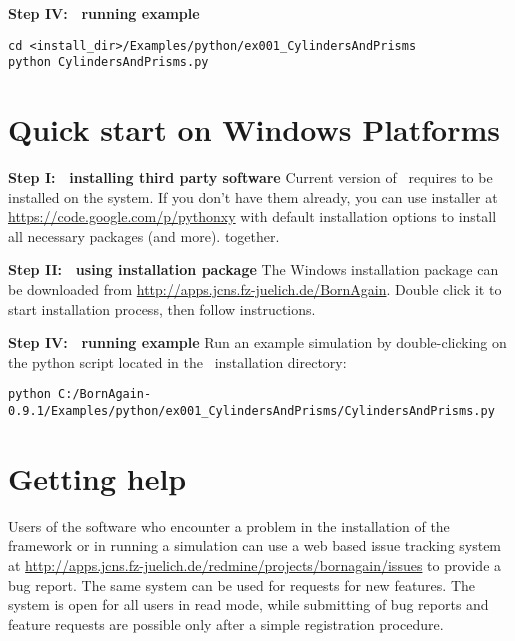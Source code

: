 \noindent
{\bf Step IV: $~$ running example}
\begin{lstlisting}[language=shell, style=commandline]
cd <install_dir>/Examples/python/ex001_CylindersAndPrisms
python CylindersAndPrisms.py
\end{lstlisting}



\section{Quick start on Windows Platforms}

\noindent
{\bf Step I: $~$ installing third party software} \newline
Current version of \BornAgain\ requires  
to be installed on the system.
If you don't have them already, you can use  installer
at \url{https://code.google.com/p/pythonxy} with default installation options
to install all necessary packages (and more).
together.
\vspace*{2mm}

\noindent
{\bf Step II: $~$ using installation package } \newline
The Windows installation package can be downloaded from \url{http://apps.jcns.fz-juelich.de/BornAgain}.
Double click it to start installation process, then follow instructions.
\vspace*{2mm}

\noindent
{\bf Step IV: $~$ running example} \newline
Run an example simulation by double-clicking on the python script located in the \BornAgain\ installation directory:
\begin{lstlisting}[language=shell, style=commandline]
python C:/BornAgain-0.9.1/Examples/python/ex001_CylindersAndPrisms/CylindersAndPrisms.py
\end{lstlisting}


\section{Getting help}
Users of the software who encounter a problem in the installation of the framework or in running a simulation can use a web based issue tracking system
at \url{http://apps.jcns.fz-juelich.de/redmine/projects/bornagain/issues} to provide a bug
report. The same system can be used for requests for new features.
The system is open for all users in read mode, while 
submitting of bug reports and feature requests are possible only after a simple registration
procedure.







